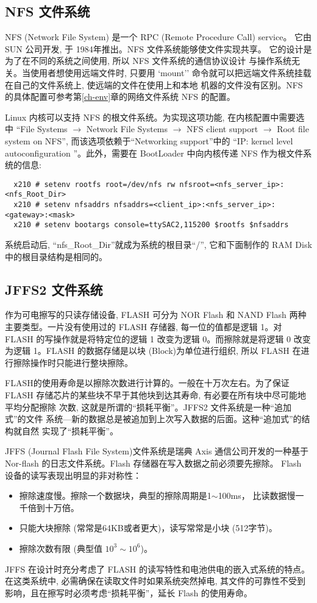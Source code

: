 \subsection{NFS 文件系统}
NFS (Network File System) 是一个 RPC (Remote Procedure Call) service。
它由 SUN 公司开发, 于 1984年推出。NFS 文件系统能够使文件实现共享。
它的设计是为了在不同的系统之间使用, 所以 NFS 文件系统的通信协议设计
与操作系统无关。当使用者想使用远端文件时, 只要用 `mount''
命令就可以把远端文件系统挂载在自己的文件系统上, 使远端的文件在使用上和本地
机器的文件没有区别。NFS 的具体配置可参考第\ref{ch-env}章的网络文件系统 NFS
的配置。

Linux 内核可以支持 NFS 的根文件系统。为实现这项功能, 在内核配置中需要选中
``File Systems $\to$ Network File Systems $\to$  NFS client support  $\to$
 Root file system on NFS'', 而该选项依赖于``Networking support''中的
``IP: kernel level autoconfiguration ''。此外，需要在 BootLoader 中向内核传递
NFS 作为根文件系统的信息:
\begin{verbatim}
  x210 # setenv rootfs root=/dev/nfs rw nfsroot=<nfs_server_ip>:<nfs_Root_Dir>
  x210 # setenv nfsaddrs nfsaddrs=<client_ip>:<nfs_server_ip>:<gateway>:<mask>
  x210 # setenv bootargs console=ttySAC2,115200 $rootfs $nfsaddrs
\end{verbatim}

系统启动后, ``nfs\_Root\_Dir''就成为系统的根目录``/'', 它和下面制作的
RAM Disk 中的根目录结构是相同的。

\subsection{JFFS2 文件系统}

作为可电擦写的只读存储设备, FLASH 可分为 NOR Flash 和 NAND Flash 两种
主要类型。一片没有使用过的 FLASH 存储器, 每一位的值都是逻辑 1。对
FLASH 的写操作就是将特定位的逻辑 1 改变为逻辑 0。而擦除就是将逻辑 0
改变为逻辑 1。FLASH 的数据存储是以块 (Block)为单位进行组织, 所以 FLASH
在进行擦除操作时只能进行整块擦除。

FLASH的使用寿命是以擦除次数进行计算的。一般在十万次左右。为了保证 FLASH
存储芯片的某些块不早于其他块到达其寿命, 有必要在所有块中尽可能地平均分配擦除
次数, 这就是所谓的``损耗平衡''。JFFS2 文件系统是一种``追加式''的文件
系统---新的数据总是被追加到上次写入数据的后面。这种``追加式''的结构就自然
实现了``损耗平衡''。

JFFS (Journal Flash File System)文件系统是瑞典 Axis 通信公司开发的一种基于
Nor-flash 的日志文件系统。Flash 存储器在写入数据之前必须要先擦除。
Flash 设备的读写表现出明显的非对称性：
\begin{itemize}
    \item 擦除速度慢。擦除一个数据块，典型的擦除周期是1$\sim$100ms，
        比读数据慢一千倍到十万倍。
    \item 只能大块擦除 (常常是64KB或者更大)，读写常常是小块 (512字节)。
    \item 擦除次数有限 (典型值 $10^3\sim10^6$)。
\end{itemize}
JFFS 在设计时充分考虑了 FLASH 的读写特性和电池供电的嵌入式系统的特点。
在这类系统中, 必需确保在读取文件时如果系统突然掉电, 其文件的可靠性不受到
影响，且在擦写时必须考虑``损耗平衡''，延长 Flash 的使用寿命。

